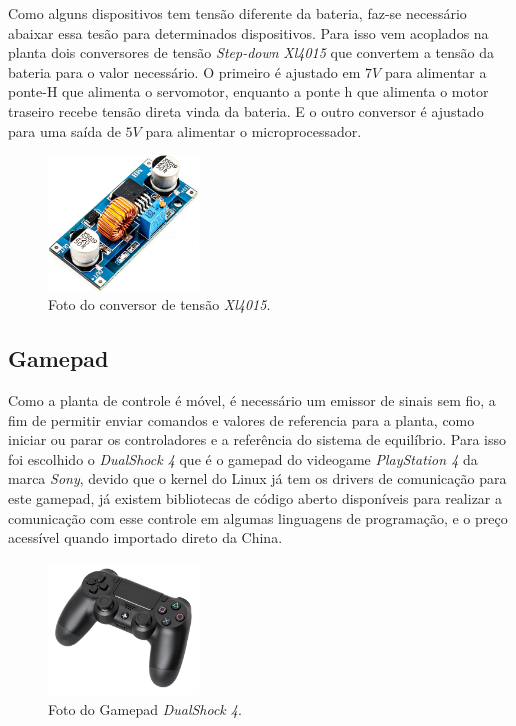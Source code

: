     	   Como alguns dispositivos tem tensão diferente da bateria, faz-se necessário abaixar essa tesão para determinados dispositivos. Para isso vem acoplados na planta dois conversores de tensão \textit{Step-down} \textit{Xl4015} que convertem a tensão da bateria para o valor necessário. O primeiro é ajustado em $7V$ para alimentar a ponte-H que alimenta o servomotor, enquanto a ponte h que alimenta o motor traseiro recebe tensão direta vinda da bateria. E o outro conversor é ajustado para uma saída de $5V$ para alimentar o microprocessador.
    	
        	\begin{figure}[h]
                \centering
                \includegraphics[width=4cm]{Imagens/cap2/xl.jpg}
                \caption{Foto do conversor de tensão \textit{Xl4015}.}
                \label{img:theta}
            \end{figure}
        
        \subsection{Gamepad}
        
            Como a planta de controle é móvel, é necessário um emissor de sinais sem fio, a fim de permitir enviar comandos e valores de referencia para a planta, como iniciar ou parar os controladores e a referência do sistema de equilíbrio. Para isso foi escolhido o \textit{DualShock 4} que é o gamepad do videogame \textit{PlayStation 4} da marca \textit{Sony}, devido que o kernel do Linux já tem os drivers de comunicação para este gamepad, já existem bibliotecas de código aberto disponíveis para realizar a comunicação com esse controle em algumas linguagens de programação, e o preço acessível quando importado direto da China.
            
            \begin{figure}[h]
                \centering
                \includegraphics[width=4cm]{Imagens/cap2/DualShock_4.jpg}
                \caption{Foto do Gamepad \textit{DualShock 4}.}
                \label{img:ds4}
            \end{figure}
            
